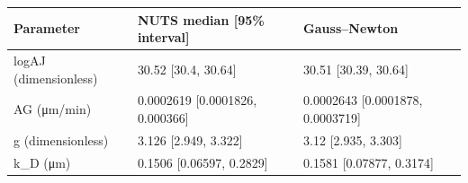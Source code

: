 \begin{tabular}{lll}
Parameter & NUTS median [95\% interval] & Gauss--Newton \\
\hline
logAJ (dimensionless) & 30.52 [30.4, 30.64] & 30.51 [30.39, 30.64] \\
AG (μm/min) & 0.0002619 [0.0001826, 0.000366] & 0.0002643 [0.0001878, 0.0003719] \\
g (dimensionless) & 3.126 [2.949, 3.322] & 3.12 [2.935, 3.303] \\
k\_D (μm) & 0.1506 [0.06597, 0.2829] & 0.1581 [0.07877, 0.3174] \\
\end{tabular}
